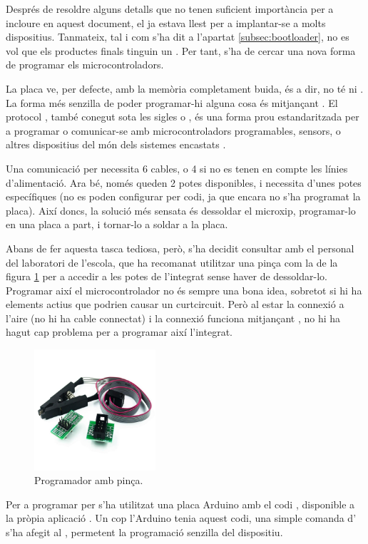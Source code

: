 Després de resoldre alguns detalls que no tenen suficient importància per a
incloure en aquest document, el  ja estava llest per a 
implantar-se a molts dispositius. Tanmateix, tal i com s'ha dit a
l'apartat \ref{subsec:bootloader}, no es vol que els productes finals tinguin
un . Per tant, s'ha de cercar una nova forma de programar
els microcontroladors.

La placa  ve, per defecte, amb la memòria  completament
buida, és a dir, no té ni . La forma més senzilla de poder
programar-hi alguna cosa és mitjançant . El protocol
, també conegut sota les sigles  o
, és una forma prou estandaritzada per a
programar o comunicar-se amb microcontroladors programables, sensors, o altres
dispositius del món dels sistemes encastats \cite{Isp}.

Una comunicació per  necessita 6 cables, o 4 si no es tenen en compte
les línies d'alimentació. Ara bé, només queden 2 potes disponibles, i 
necessita d'unes potes específiques (no es poden configurar per codi, ja que
encara no s'ha programat la placa). Així doncs, la solució més sensata és
dessoldar el microxip, programar-lo en una placa a part, i tornar-lo a soldar
a la placa.

Abans de fer aquesta tasca tediosa, però, s'ha decidit consultar amb el
personal del laboratori de l'escola, que ha recomanat utilitzar una pinça com
la de la figura \ref{fig:programmer} per a accedir a les potes de l'integrat sense haver
de dessoldar-lo. Programar així el microcontrolador no és sempre una bona idea,
sobretot si hi ha elements actius que podrien causar un curtcircuit. Però al estar
la connexió  a l'aire (no hi ha cable connectat) i la connexió
 funciona mitjançant , no hi ha hagut cap problema per
a programar així l'integrat.

\begin{figure}[ht]
    \centering
    \includegraphics[width=0.4\textwidth]{images/device/programmer.jpeg}
    \caption{Programador  amb pinça.}
    \label{fig:programmer}
\end{figure}

Per a programar per  s'ha utilitzat una placa Arduino amb el codi
, disponible a la pròpia aplicació 
\cite{ArduinoIsp}. Un cop
l'Arduino tenia aquest codi, una simple comanda d' s'ha afegit
al , permetent la programació senzilla del dispositiu.
